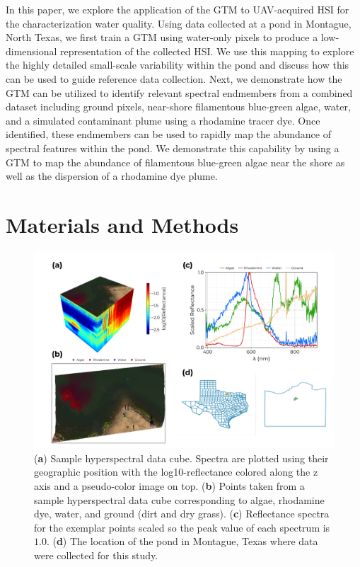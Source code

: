 \documentclass[remotesensing,article,submit,pdftex,moreauthors]{Definitions/mdpi}
\begin{document}
In this paper, we explore the application of the GTM to UAV-acquired HSI for the characterization water quality. Using data collected at a pond in Montague, North Texas, we first train a GTM using water-only pixels to produce a low-dimensional representation of the collected HSI. We use this mapping to explore the highly detailed small-scale variability within the pond and discuss how this can be used to guide reference data collection. Next, we demonstrate how the GTM can be utilized to identify relevant spectral endmembers from a combined dataset including ground pixels, near-shore filamentous blue-green algae, water, and a simulated contaminant plume using a rhodamine tracer dye. Once identified, these endmembers can be used to rapidly map the abundance of spectral features within the pond. We demonstrate this capability by using a GTM to map the abundance of filamentous blue-green algae near the shore as well as the dispersion of a rhodamine dye plume. 

\section{Materials and Methods}\label{materials-and-methods}


\begin{figure}[t]
\centering
\includegraphics[width=\columnwidth]{paper/figures/methods/sample-spectra.pdf}
\caption{(\textbf{a}) Sample hyperspectral data cube. Spectra are plotted using their geographic position with the log10-reflectance colored along the z axis and a pseudo-color image on top. (\textbf{b}) Points taken from a sample hyperspectral data cube corresponding to algae, rhodamine dye, water, and ground (dirt and dry grass). (\textbf{c}) Reflectance spectra for the exemplar points scaled so the peak value of each spectrum is $1.0$. (\textbf{d}) The location of the pond in Montague, Texas where data were collected for this study.\label{fig:sample-spectra}}
\end{figure}  
\end{document}
